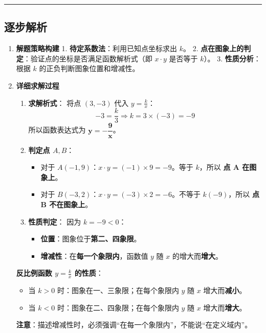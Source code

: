 \documentclass[UTF8]{ctexart}
\newenvironment{redenv}{\color{red}}{}
\newenvironment{detailedanalysis}{%
    \color{red}
    \begin{enumerate}[label=\textbf{第\arabic*步：}, leftmargin=*, align=left, itemsep=1.5ex]
}{%
    \end{enumerate}
}
\newenvironment{conceptbox}{%
    \begin{tcolorbox}[colback=red!5, colframe=red!50!black, title=概念解析, fonttitle=\bfseries]
}{%
    \end{tcolorbox}
}
\newcommand{\analysisrule}{\noindent\rule{\textwidth}{0.8pt}\vspace{-0.8em}}
\begin{document}
\begin{redenv}
\analysisrule
\subsection*{逐步解析}

\begin{detailedanalysis}
\item \textbf{解题策略构建}
1. \textbf{待定系数法}：利用已知点坐标求出 $k$。
2. \textbf{点在图象上的判定}：验证点的坐标是否满足函数解析式（即 $x \cdot y$ 是否等于 $k$）。
3. \textbf{性质分析}：根据 $k$ 的正负判断图象位置和增减性。

\item \textbf{详细求解过程}
\begin{enumerate}[label=(\arabic*)]
    \item \textbf{求解析式}：
    将点 $(3, -3)$ 代入 $y = \frac{k}{x}$：
    \[ -3 = \frac{k}{3} \Rightarrow k = 3 \times (-3) = -9 \]
    所以函数表达式为 $\boldsymbol{y = -\dfrac{9}{x}}$。

    \item \textbf{判定点 $A, B$}：
    \begin{itemize}
        \item 对于 $A(-1, 9)$：$x \cdot y = (-1) \times 9 = -9$。等于 $k$，所以 \textbf{点 A 在图象上}。
        \item 对于 $B(-3, 2)$：$x \cdot y = (-3) \times 2 = -6$。不等于 $k (-9)$，所以 \textbf{点 B 不在图象上}。
    \end{itemize}

    \item \textbf{性质判定}：
    因为 $k = -9 < 0$：
    \begin{itemize}
        \item \textbf{位置}：图象位于\textbf{第二、四象限}。
        \item \textbf{增减性}：在\textbf{每一个象限内}，函数值 $y$ 随 $x$ 的增大而\textbf{增大}。
    \end{itemize}
\end{enumerate}

\begin{conceptbox}
\textbf{反比例函数 $y=\frac{k}{x}$ 的性质}：
\begin{itemize}
    \item 当 $k>0$ 时：图象在一、三象限；在每个象限内 $y$ 随 $x$ 增大而\textbf{减小}。
    \item 当 $k<0$ 时：图象在二、四象限；在每个象限内 $y$ 随 $x$ 增大而\textbf{增大}。
\end{itemize}
\textbf{注意}：描述增减性时，必须强调“在每一个象限内”，不能说“在定义域内”。
\end{conceptbox}

\end{detailedanalysis}
\end{redenv}
\end{document}
